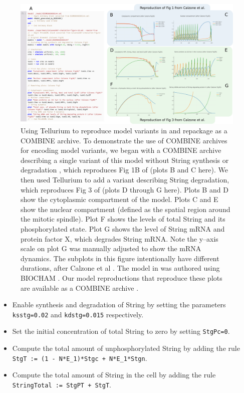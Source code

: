 \documentclass[10pt,letterpaper]{article}
\begin{document}
\begin{figure}
  \includegraphics[width=1.0\textwidth]{fig-calzone.pdf}
  \caption{Using Tellurium to reproduce model variants in \cite{calzone2007dynamical} and repackage as a COMBINE archive. To demonstrate the use of COMBINE archives for encoding model variants, we began with a COMBINE archive describing a single variant of this model without String synthesis or degradation \cite{scharmShowcase}, which reproduces Fig 1B of \cite{calzone2007dynamical} (plots B and C here). We then used Tellurium to add a variant describing String degradation, which reproduces Fig 3 of \cite{calzone2007dynamical} (plots D through G here). Plots B and D show the cytoplasmic compartment of the model. Plots C and E show the nuclear compartment (defined as the spatial region around the mitotic spindle). Plot F shows the levels of total String and its phosphorylated state. Plot G shows the level of String mRNA and protein factor X, which degrades String mRNA. Note the y--axis scale on plot G was manually adjusted to show the mRNA dynamics. The subplots in this figure intentionally have different durations, after Calzone et al \cite{calzone2007dynamical}. The model in \cite{calzone2007dynamical} was authored using BIOCHAM \cite{calzone2006biocham}. Our model reproductions that reproduce these plots are available as a COMBINE archive \cite{calzone-fig1-fig3}. }
  \label{fig:calzone}
\end{figure}

\begin{itemize}
\item Enable synthesis and degradation of String by setting the parameters \texttt{ksstg=0.02} and \texttt{kdstg=0.015} respectively.
\item Set the initial concentration of total String to zero by setting \texttt{StgPc=0}.
\item Compute the total amount of unphosphorylated String by adding the rule \newline \texttt{StgT := (1 - N*E\_1)*Stgc + N*E\_1*Stgn}.
\item Compute the total amount of String in the cell by adding the rule \newline \texttt{StringTotal := StgPT + StgT}.
\end{itemize}
\end{document}

